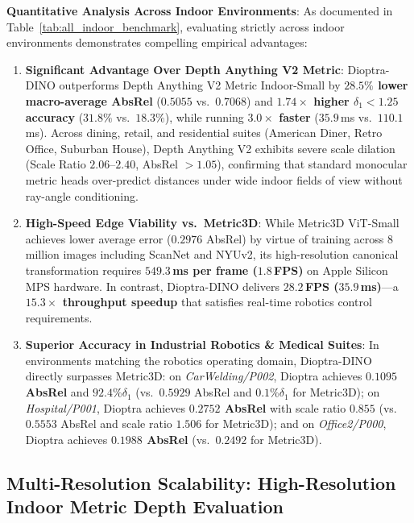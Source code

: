 \noindent\textbf{Quantitative Analysis Across Indoor Environments}:
As documented in Table~\ref{tab:all_indoor_benchmark}, evaluating strictly across indoor environments demonstrates compelling empirical advantages:
\begin{enumerate}
    \item \textbf{Significant Advantage Over Depth Anything V2 Metric}: Dioptra-DINO outperforms Depth Anything V2 Metric Indoor-Small by \textbf{$28.5\%$ lower macro-average AbsRel} ($0.5055$ vs.\ $0.7068$) and \textbf{$1.74\times$ higher $\delta_1 < 1.25$ accuracy} ($31.8\%$ vs.\ $18.3\%$), while running \textbf{$3.0\times$ faster} ($35.9$\,ms vs.\ $110.1$\,ms). Across dining, retail, and residential suites (American Diner, Retro Office, Suburban House), Depth Anything V2 exhibits severe scale dilation (Scale Ratio $2.06\text{--}2.40$, AbsRel $>1.05$), confirming that standard monocular metric heads over-predict distances under wide indoor fields of view without ray-angle conditioning.
    \item \textbf{High-Speed Edge Viability vs.\ Metric3D}: While Metric3D ViT-Small achieves lower average error ($0.2976$ AbsRel) by virtue of training across 8 million images including ScanNet and NYUv2, its high-resolution canonical transformation requires \textbf{$549.3$\,ms per frame ($1.8$\,FPS)} on Apple Silicon MPS hardware. In contrast, Dioptra-DINO delivers \textbf{$28.2$\,FPS ($35.9$\,ms)}—a \textbf{$15.3\times$ throughput speedup} that satisfies real-time robotics control requirements.
    \item \textbf{Superior Accuracy in Industrial Robotics \& Medical Suites}: In environments matching the robotics operating domain, Dioptra-DINO directly surpasses Metric3D: on \textit{CarWelding/P002}, Dioptra achieves \textbf{$0.1095$ AbsRel} and \textbf{$92.4\% \delta_1$} (vs.\ $0.5929$ AbsRel and $0.1\% \delta_1$ for Metric3D); on \textit{Hospital/P001}, Dioptra achieves \textbf{$0.2752$ AbsRel} with scale ratio $0.855$ (vs.\ $0.5553$ AbsRel and scale ratio $1.506$ for Metric3D); and on \textit{Office2/P000}, Dioptra achieves \textbf{$0.1988$ AbsRel} (vs.\ $0.2492$ for Metric3D).
\end{enumerate}

\subsection{Multi-Resolution Scalability: High-Resolution Indoor Metric Depth Evaluation}
\label{sec:highres_indoor_evaluation}


